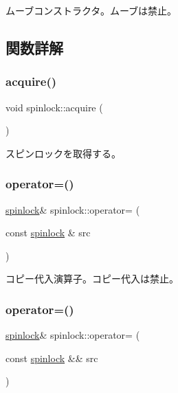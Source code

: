 ムーブコンストラクタ。ムーブは禁止。 

\subsection{関数詳解}
\hypertarget{classspinlock_af5978d97d07ae5f9e8a4cdc91739cf57}{}\label{classspinlock_af5978d97d07ae5f9e8a4cdc91739cf57} 
\subsubsection{\texorpdfstring{acquire()}{acquire()}}
{\footnotesize\ttfamily void spinlock\+::acquire (\begin{DoxyParamCaption}{ }\end{DoxyParamCaption})}

スピンロックを取得する。 \hypertarget{classspinlock_a0770087a012a62147ee94e1d0c6fb083}{}\label{classspinlock_a0770087a012a62147ee94e1d0c6fb083} 
\subsubsection{\texorpdfstring{operator=()}{operator=()}\hspace{0.1cm}{\footnotesize\ttfamily [1/2]}}
{\footnotesize\ttfamily \hyperlink{classspinlock}{spinlock}\& spinlock\+::operator= (\begin{DoxyParamCaption}\item[{const \hyperlink{classspinlock}{spinlock} \&}]{src }\end{DoxyParamCaption})\hspace{0.3cm}{\ttfamily [delete]}}

コピー代入演算子。コピー代入は禁止。 \hypertarget{classspinlock_a4a67e0a1797db0dfe37af2ce158a17d0}{}\label{classspinlock_a4a67e0a1797db0dfe37af2ce158a17d0} 
\subsubsection{\texorpdfstring{operator=()}{operator=()}\hspace{0.1cm}{\footnotesize\ttfamily [2/2]}}
{\footnotesize\ttfamily \hyperlink{classspinlock}{spinlock}\& spinlock\+::operator= (\begin{DoxyParamCaption}\item[{const \hyperlink{classspinlock}{spinlock} \&\&}]{src }\end{DoxyParamCaption})\hspace{0.3cm}{\ttfamily [delete]}}

